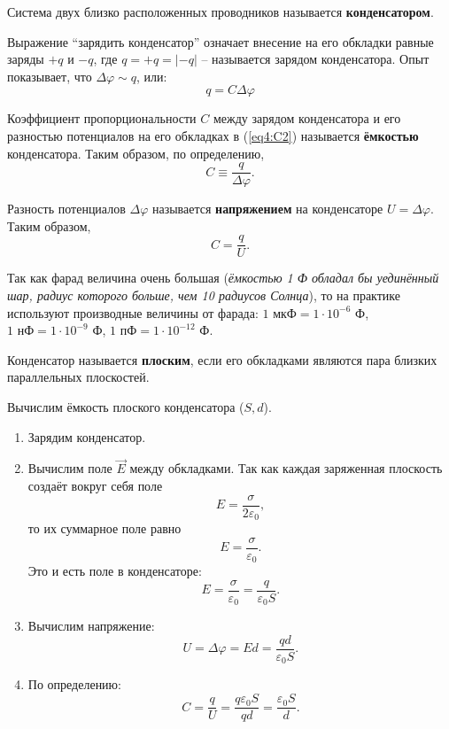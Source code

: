    \begin{definition}
        Система двух близко расположенных проводников называется
        \textbf{конденсатором}.
    \end{definition}

    Выражение ``зарядить конденсатор'' означает внесение на его обкладки равные
    заряды \( +q \) и \( -q \), где \( q = +q = |-q| \) -- называется зарядом
    конденсатора. Опыт показывает, что \( \Delta\varphi \sim q \), или:
    \begin{equation}
        \label{eq4:C2}
        q = C \Delta\varphi
    \end{equation}

    \begin{definition}
        Коэффициент пропорциональности \( C \) между зарядом конденсатора и его
        разностью потенциалов на его обкладках в (\ref{eq4:C2}) называется
        \textbf{ёмкостью} конденсатора. Таким образом, по определению,
        \[
            C \equiv \frac{q}{\Delta\varphi}.
        \]
    \end{definition}

    \begin{remark}
        Разность потенциалов \( \Delta\varphi \) называется \textbf{напряжением}
        на конденсаторе \( U = \Delta\varphi \). Таким образом,
        \[
            C = \frac{q}{U}.
        \]
    \end{remark}

    Так как фарад величина очень большая (\textit{ёмкостью 1 Ф обладал бы 
    уединённый шар, радиус которого больше, чем 10 радиусов Солнца}), то на 
    практике используют производные величины от фарада: \( 1\text{ мкФ} =
    1 \cdot 10^{-6}\text{ Ф} \), \( 1\text{ нФ} = 1 \cdot 10^{-9}\text{ Ф} \),
    \( 1\text{ пФ} = 1 \cdot 10^{-12}\text{ Ф} \).

        \begin{definition}
        Конденсатор называется \textbf{плоским}, если его обкладками являются
        пара близких параллельных плоскостей. %
    \end{definition}

    Вычислим ёмкость плоского конденсатора (\( S, d \)). %
    \begin{enumerate}
        \item Зарядим конденсатор.
        \item Вычислим поле \( \vec{E} \) между обкладками.
        Так как каждая заряженная плоскость создаёт вокруг себя поле
        \[
            E = \frac{\sigma}{2\varepsilon_0},
        \]
        то их суммарное поле равно
        \[
            E = \frac{\sigma}{\varepsilon_0}.
        \]
         Это и есть поле в конденсаторе:
         \[
             E = \frac{\sigma}{\varepsilon_0} = \frac{q}{\varepsilon_0 S}.
         \]
        \item Вычислим напряжение:
            \[
                U = \Delta\varphi = Ed = \frac{qd}{\varepsilon_0 S}.
            \]
        \item По определению:
        \[
            C = \frac{q}{U} = \frac{q\varepsilon_0 S}{qd} =
            \frac{\varepsilon_0 S}{d}.
        \]
    \end{enumerate}

